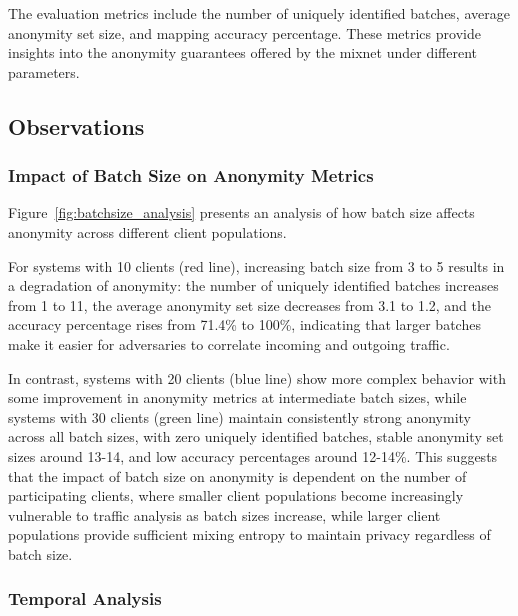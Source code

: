 \documentclass{article}
\begin{document}
The evaluation metrics include the number of uniquely identified 
batches, average anonymity set size, and mapping accuracy percentage. 
These metrics provide insights into the anonymity guarantees offered 
by the mixnet under different parameters.

\subsection{Observations}

\subsubsection{Impact of Batch Size on Anonymity Metrics}

Figure~\ref{fig:batchsize_analysis} presents an analysis 
of how batch size affects anonymity across different 
client populations. 

For systems with 10 clients 
(red line), increasing batch size from 3 to 5 results in a 
degradation of anonymity: the number of uniquely 
identified batches increases from 1 to 11, the 
average anonymity set size decreases from 3.1 to 1.2, and the 
accuracy percentage rises from 71.4\% to 100\%, 
indicating that larger batches make it easier for 
adversaries to correlate incoming and outgoing traffic. 

In contrast, systems with 20 clients (blue line) show more 
complex behavior with some improvement in anonymity metrics 
at intermediate batch sizes, while systems with 30 clients 
(green line) maintain consistently strong anonymity across 
all batch sizes, with zero uniquely identified batches, 
stable anonymity set sizes around 13-14, and low accuracy 
percentages around 12-14\%. This suggests that the impact 
of batch size on anonymity is dependent on the number 
of participating clients, where smaller client populations 
become increasingly vulnerable to traffic analysis as batch 
sizes increase, while larger client populations provide 
sufficient mixing entropy to maintain privacy regardless 
of batch size.


\subsubsection{Temporal Analysis}
\end{document}
